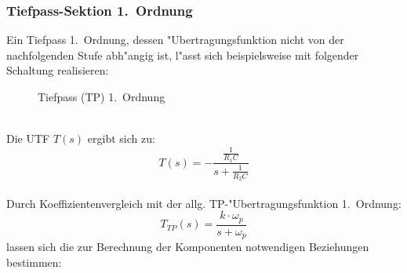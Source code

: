 \subsubsection{Tiefpass-Sektion 1.~Ordnung}
Ein Tiefpass 1.~Ordnung, dessen "Ubertragungsfunktion nicht von der nachfolgenden
Stufe abh"angig ist, l"asst sich beispielsweise mit folgender Schaltung 
realisieren:
\begin{figure}[!htb]
\vspace*{-3mm}
\begin{center}
  \caption{Tiefpass (TP) 1.~Ordnung \label{tp-1}}
\end{center}
\vspace*{-6mm}
\end{figure}\\  
\nit Die UTF $T(s)$ ergibt sich zu:
\begin{equation*}
T(s)=- \frac{
\displaystyle\frac{1}{R_1 C}}{s + 
\displaystyle\frac{1}{R_2 C}}
\end{equation*}\\
\nit Durch Koeffizientenvergleich mit der allg. TP-"Ubertragungsfunktion 
1.~Ordnung:
\begin{equation}
T_{TP}(s)=\frac{k \cdot \omega_{p}}{s + \omega_p}
\end{equation}
lassen sich die zur Berechnung der Komponenten notwendigen Beziehungen 
bestimmen:\\~~\\
